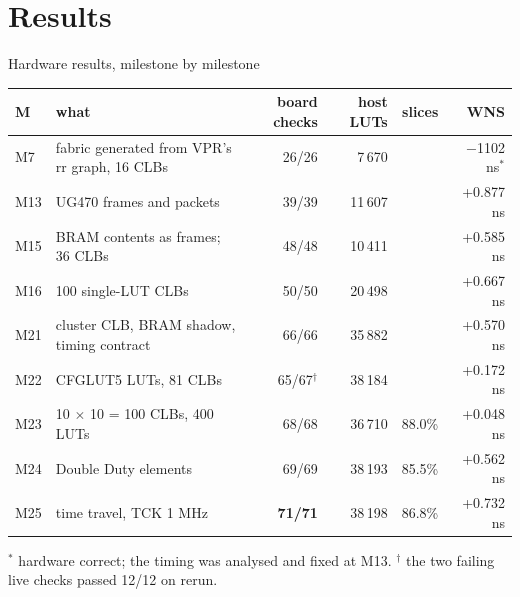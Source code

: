 \documentclass[aspectratio=169,11pt]{beamer}
\newcommand{\src}[1]{{\scriptsize\color{bobmute}#1}}
\begin{document}
\section{Results}
\begin{frame}{Hardware results, milestone by milestone}
  \centering
  \scriptsize
  \begin{tabular}{@{}llrrrr@{}}
    \toprule
    M & what & board checks & host LUTs & slices & WNS \\
    \midrule
    M7  & fabric generated from VPR's rr graph, 16 CLBs & 26/26 & 7\,670 & & $-$1102 ns$^*$ \\
    M13 & UG470 frames and packets & 39/39 & 11\,607 & & +0.877 ns \\
    M15 & BRAM contents as frames; 36 CLBs & 48/48 & 10\,411 & & +0.585 ns \\
    M16 & 100 single-LUT CLBs & 50/50 & 20\,498 & & +0.667 ns \\
    M21 & cluster CLB, BRAM shadow, timing contract & 66/66 & 35\,882 & & +0.570 ns \\
    M22 & CFGLUT5 LUTs, 81 CLBs & 65/67$^\dagger$ & 38\,184 & & +0.172 ns \\
    M23 & 10 $\times$ 10 = 100 CLBs, 400 LUTs & 68/68 & 36\,710 & 88.0\% & +0.048 ns \\
    M24 & Double Duty elements & 69/69 & 38\,193 & 85.5\% & +0.562 ns \\
    M25 & time travel, TCK 1 MHz & \textbf{71/71} & 38\,198 & 86.8\% & +0.732 ns \\
    \bottomrule
  \end{tabular}
  \vspace{2mm}

  \src{$^*$ hardware correct; the timing was analysed and fixed at M13. $^\dagger$ the two failing live checks passed 12/12 on rerun.}
\end{frame}
\end{document}
